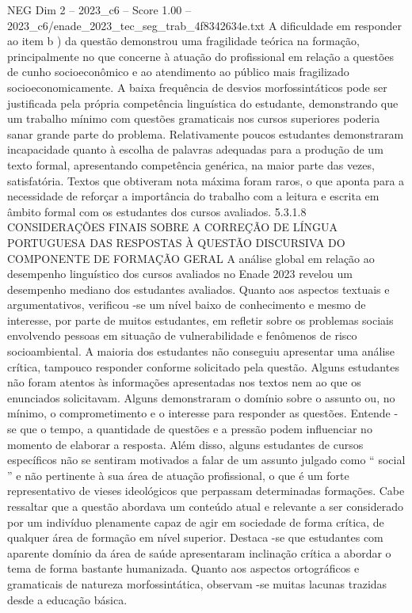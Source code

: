 \begin{textsample}{NEG Dim 2 – 2023\_c6 – Score 1.00 – 2023\_c6/enade\_2023\_tec\_seg\_trab\_4f8342634e.txt}
A dificuldade em responder ao item b ) da questão demonstrou uma fragilidade teórica na formação, principalmente no que concerne à atuação do profissional em relação a questões de cunho socioeconômico e ao atendimento ao público mais fragilizado socioeconomicamente.
A baixa frequência de desvios morfossintáticos pode ser justificada pela própria competência linguística do estudante, demonstrando que um trabalho mínimo com questões gramaticais nos cursos superiores poderia sanar grande parte do problema.
Relativamente poucos estudantes demonstraram incapacidade quanto à escolha de palavras adequadas para a produção de um texto formal, apresentando competência genérica, na maior parte das vezes, satisfatória.
Textos que obtiveram nota máxima foram raros, o que aponta para a necessidade de reforçar a importância do trabalho com a leitura e escrita em âmbito formal com os estudantes dos cursos avaliados. 5.3.1.8 CONSIDERAÇÕES FINAIS SOBRE A CORREÇÃO DE LÍNGUA PORTUGUESA DAS RESPOSTAS À QUESTÃO DISCURSIVA DO COMPONENTE DE FORMAÇÃO GERAL A análise global em relação ao desempenho linguístico dos cursos avaliados no Enade 2023 revelou um desempenho mediano dos estudantes avaliados.
Quanto aos aspectos textuais e argumentativos, verificou -se um nível baixo de conhecimento e mesmo de interesse, por parte de muitos estudantes, em refletir sobre os problemas sociais envolvendo pessoas em situação de vulnerabilidade e fenômenos de risco socioambiental.
A maioria dos estudantes não conseguiu apresentar uma análise crítica, tampouco responder conforme solicitado pela questão.
Alguns estudantes não foram atentos às informações apresentadas nos textos nem ao que os enunciados solicitavam.
Alguns demonstraram o domínio sobre o assunto ou, no mínimo, o comprometimento e o interesse para responder as questões.
Entende -se que o tempo, a quantidade de questões e a pressão podem influenciar no momento de elaborar a resposta.
Além disso, alguns estudantes de cursos específicos não se sentiram motivados a falar de um assunto julgado como “ social ” e não pertinente à sua área de atuação profissional, o que é um forte representativo de vieses ideológicos que perpassam determinadas formações.
Cabe ressaltar que a questão abordava um conteúdo atual e relevante a ser considerado por um indivíduo plenamente capaz de agir em sociedade de forma crítica, de qualquer área de formação em nível superior.
Destaca -se que estudantes com aparente domínio da área de saúde apresentaram inclinação crítica a abordar o tema de forma bastante humanizada.
Quanto aos aspectos ortográficos e gramaticais de natureza morfossintática, observam -se muitas lacunas trazidas desde a educação básica.

\end{textsample}
